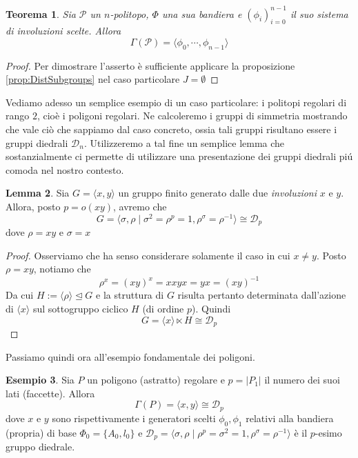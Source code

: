 \documentclass[a4paper,12pt]{report}
\newcommand{\p}{\mathcal{P}}
\theoremstyle{plain}
\newtheorem{teo}{Teorema}[chapter]
\theoremstyle{definition}
\newtheorem{lem}[teo]{Lemma}
\newtheorem{example}[teo]{Esempio}
\begin{document}
\begin{teo}
\label{teo:Generators}
Sia $\p$ un $n$-politopo, $\Phi$ una sua bandiera e $(\phi_i)_{i=0}^{n-1}$ il suo sistema di involuzioni scelte. Allora
\begin{equation*}
\Gamma(\p)=\langle\phi_0,\cdots,\phi_{n-1}\rangle
\end{equation*}
\end{teo}
\begin{proof}
Per dimostrare l'asserto \`e sufficiente applicare la proposizione \ref{prop:DistSubgroups} nel caso particolare $J=\emptyset$
\end{proof}
Vediamo adesso un semplice esempio di un caso particolare: i politopi regolari di rango $2$, cio\`e i poligoni regolari. Ne calcoleremo
i gruppi di simmetria mostrando che vale ci\`o che sappiamo dal caso concreto, ossia tali gruppi risultano essere i gruppi diedrali $\mathcal{D}_n$.
Utilizzeremo a tal fine un semplice lemma che sostanzialmente ci permette di utilizzare una presentazione dei gruppi diedrali pi\'u comoda nel
nostro contesto.
\begin{lem}
\label{lem:DihedralPresentations}
Sia $G=\langle x,y\rangle$ un gruppo finito generato dalle due \emph{involuzioni} $x$ e $y$. Allora, posto $p=o(xy)$, avremo che
\begin{equation*}
G=\langle \sigma,\rho\mid \sigma^2=\rho^p=1,\rho^\sigma=\rho^{-1}\rangle\cong\mathcal{D}_p
\end{equation*}
dove $\rho=xy$ e $\sigma=x$
\end{lem}
\begin{proof}
Osserviamo che ha senso considerare solamente il caso in cui $x\neq y$. Posto $\rho=xy$, notiamo che
\begin{equation*}
\rho^x=(xy)^x=xxyx=yx=(xy)^{-1}
\end{equation*}
Da cui $H:=\langle\rho\rangle\trianglelefteq G$ e la struttura di $G$ risulta pertanto determinata dall'azione di $\langle x\rangle$ sul
sottogruppo ciclico $H$ (di ordine $p$). Quindi
\begin{equation*}
G=\langle x\rangle\ltimes H\cong\mathcal{D}_p
\end{equation*}
\end{proof}
Passiamo quindi ora all'esempio fondamentale dei poligoni.
\begin{example}
\label{example:PolygonsDihedral}
Sia $P$ un poligono (astratto) regolare e $p=\left|P_1\right|$ il numero dei suoi lati (faccette). Allora
\begin{equation*}
\Gamma(P)=\langle x,y\rangle\cong\mathcal{D}_p
\end{equation*}
dove $x$ e $y$ sono rispettivamente i generatori scelti $\phi_0,\phi_1$ relativi alla bandiera (propria) di base $\Phi_0=\{A_0,l_0\}$ e
$\mathcal{D}_p=\langle \sigma,\rho\mid \rho^p=\sigma^2=1,\rho^\sigma=\rho^{-1}\rangle$ \`e il $p$-esimo gruppo diedrale.
\end{example}
\end{document}
